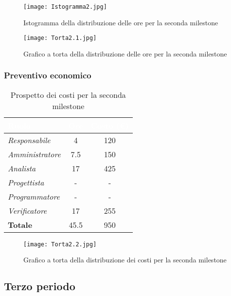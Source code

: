 \begin{figure}[H]
    \texttt{[image: Istogramma2.jpg]}
    \caption{Istogramma della distribuzione delle ore per la seconda milestone}
\end{figure}

\begin{figure}[H]
    \texttt{[image: Torta2.1.jpg]}
    \caption{Grafico a torta della distribuzione delle ore per la seconda milestone}
\end{figure}

\newpage
\subsubsection{Preventivo economico}

\begin{table}[H]
    \renewcommand\arraystretch{1.5}
    \centering
    \begin{tabular}{|l|c|c|}
    \hline
    \rowcolor[HTML]{036400}
    \textcolor{white}{\textbf{Ruolo}} & \multicolumn{1}{l|}{\textcolor{white}{\textbf{Ore}}} & \multicolumn{1}{l|}{\textcolor{white}{\textbf{Costo (€)}}} \\ \hline
    \rowcolor[HTML]{EFEFEF}\textit{Responsabile} & 4 & 120 \\ \hline
    \rowcolor[HTML]{C0C0C0}\textit{Amministratore} & 7.5 & 150 \\ \hline
    \rowcolor[HTML]{EFEFEF}\textit{Analista} & 17 & 425 \\ \hline
    \rowcolor[HTML]{C0C0C0}\textit{Progettista} & - & - \\ \hline
    \rowcolor[HTML]{EFEFEF}\textit{Programmatore} & - & - \\ \hline
    \rowcolor[HTML]{C0C0C0}\textit{Verificatore} & 17 & 255 \\ \hline
    \rowcolor[HTML]{EFEFEF}\textbf{Totale} & 45.5 & 950 \\ \hline
    \end{tabular}
    \caption{Prospetto dei costi per la seconda milestone}
\end{table}

\begin{figure}[H]
    \texttt{[image: Torta2.2.jpg]}
    \caption{Grafico a torta della distribuzione dei costi per la seconda milestone}
\end{figure}



\newpage
\subsection{Terzo periodo}

